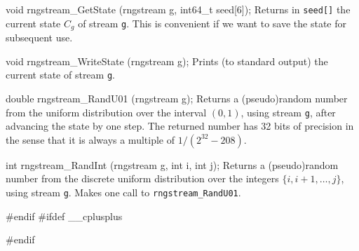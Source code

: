 {void rngstream_GetState (rngstream g, int64_t seed[6]);
\endcode
 \tab Returns in {\tt seed[]} the current state $C_g$ of stream {\tt g}.
  This is convenient if we want to save the state for subsequent use.
 \endtab
\code

void rngstream_WriteState (rngstream g);
\endcode
 \tab Prints (to standard output) the current state of stream {\tt g}.
 \endtab
\code

double rngstream_RandU01 (rngstream g);
\endcode
 \tab Returns a (pseudo)random number from the uniform distribution
   over the interval $(0,1)$, using stream {\tt g},
   after advancing the state by one step.
   The returned number has 32 bits of precision in the sense that it is
   always a multiple of $1/(2^{32}-208)$.
 \endtab
\code

int rngstream_RandInt (rngstream g, int i, int j);
\endcode
 \tab Returns a (pseudo)random number from the discrete uniform
   distribution over the integers $\{i,i+1,\dots,j\}$, using stream {\tt g}.
   Makes one call to {\tt rngstream\_RandU01}.
 \endtab
\code\hide

#endif
#ifdef __cplusplus
}
#endif
\endhide
\endcode
